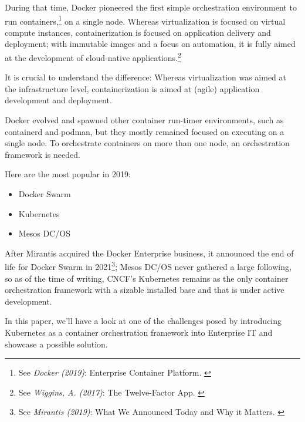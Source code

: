 During that time, Docker pioneered the first simple orchestration environment to run containers,\footnote{See \textit{Docker (2019)}: Enterprise Container Platform. \cite{docker}} on a single node. Whereas virtualization is focused on virtual compute instances, containerization is focused on application delivery and deployment; with immutable images and a focus on automation, it is fully aimed at the development of cloud-native applications.\footnote{See \textit{Wiggins, A. (2017)}: The Twelve-Factor App. \cite{12factor}}

It is crucial to understand the difference: Whereas virtualization was aimed at the infrastructure level, containerization is aimed at (agile) application development and deployment.

Docker evolved and spawned other container run-timer environments, such as containerd and podman, but they mostly remained focused on executing on a single node. To orchestrate containers on more than one node, an orchestration framework is needed. 

Here are the most popular in 2019:
\begin{itemize}
\item Docker Swarm
\item Kubernetes
\item Mesos DC/OS
\end{itemize}

After Mirantis acquired the Docker Enterprise business, it announced the end of life for Docker Swarm in 2021\footnote{See \textit{Mirantis (2019)}: What We Announced Today and Why it Matters. \cite{mirantisDocker}}; Mesos DC/OS never gathered a large following, so as of the time of writing, CNCF's Kubernetes remains as the only container orchestration framework with a sizable installed base and that is under active development.

In this paper, we'll have a look at one of the challenges posed by introducing Kubernetes as a container orchestration framework into Enterprise IT and showcase a possible solution.
